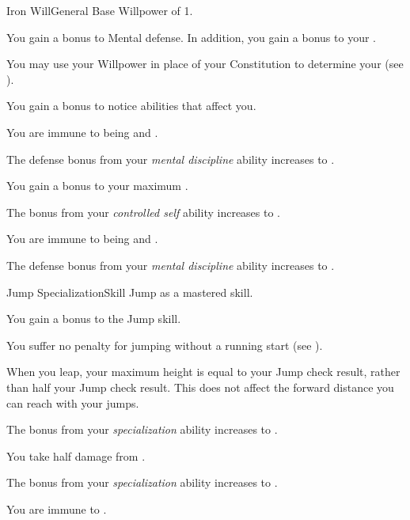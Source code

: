     \begin{feat}{Iron Will}{General}
        \featpre Base Willpower of 1.

         You gain a  bonus to Mental defense.
        In addition, you gain a  bonus to your .

         You may use your Willpower in place of your Constitution to determine your  (see ).

         You gain a  bonus to notice  abilities that affect you.

         You are immune to being \dazed and \stunned.

         The defense bonus from your \textit{mental discipline} ability increases to .

         You gain a  bonus to your maximum .

         The bonus from your \textit{controlled self} ability increases to .

         You are immune to being \disoriented and \confused.

         The defense bonus from your \textit{mental discipline} ability increases to .
    \end{feat}

    \begin{feat}{Jump Specialization}{Skill}
        \featpre Jump as a mastered skill.

         You gain a  bonus to the Jump skill.

         You suffer no penalty for jumping without a running start (see ).

         When you leap, your maximum height is equal to your Jump check result, rather than half your Jump check result.
        This does not affect the forward distance you can reach with your jumps.

         The bonus from your \textit{specialization} ability increases to .

         You take half damage from .

         The bonus from your \textit{specialization} ability increases to .

         You are immune to .
    \end{feat}

